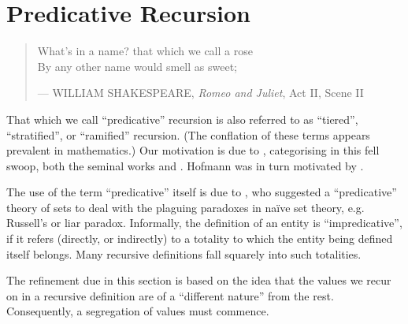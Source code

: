 \chapter{Predicative Recursion}

\begin{quotation}

\footnotesize\sffamily\itshape

\begin{flushright}

What's in a name? that which we call a rose \\
By any other name would smell as sweet;

\smallbreak

\upshape

--- WILLIAM SHAKESPEARE, \emph{Romeo and Juliet}, Act II, Scene II

\end{flushright}

\end{quotation}

That which we call ``predicative'' recursion is also referred to as
``tiered''\cite{leivant-1990}, ``stratified''\cite{leivant-1993}, or
``ramified''\cite{leivant-1995} recursion. (The conflation of these terms
appears prevalent in mathematics.) Our motivation is due to
\cite{hofmann-2000a}, categorising in this fell swoop, both the seminal works
\cite{bellantoni-cook-1992} and \cite{leivant-1995}. Hofmann was in turn
motivated by \cite{bellantoni-phd-1992}.

The use of the term ``predicative'' itself is due to \cite{russell-1907}, who
suggested a ``predicative'' theory of sets to deal with the plaguing paradoxes
in na\"ive set theory, e.g. Russell's or liar paradox. Informally, the
definition of an entity is ``impredicative''\cite{goedel-1944}, if it refers
(directly, or indirectly) to a totality to which the entity being defined
itself belongs.  Many recursive definitions fall squarely into such totalities. 


The refinement due in this section is based on the idea that the values we
recur on in a recursive definition are of a ``different nature'' from the
rest\cite{caseiro-1996}. Consequently, a segregation of values must commence.

